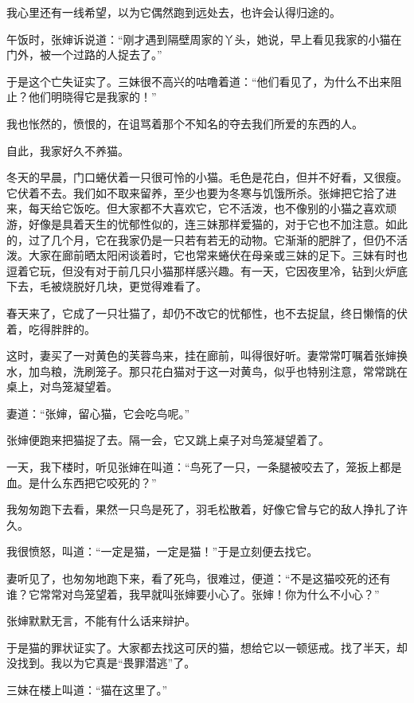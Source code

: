 \documentclass[12pt,UTF-8,openany]{ctexbook}
\begin{document}
\begin{normalsize}
    我心里还有一线希望，以为它偶然跑到远处去，也许会认得归途的。
    
    午饭时，张婶诉说道：“刚才遇到隔壁周家的丫头，她说，早上看见我家的小猫在门外，被一个过路的人捉去了。”
    
    于是这个亡失证实了。三妹很不高兴的咕噜着道：“他们看见了，为什么不出来阻止？他们明晓得它是我家的！”
    
    我也怅然的，愤恨的，在诅骂着那个不知名的夺去我们所爱的东西的人。
    
    自此，我家好久不养猫。
    
    冬天的早晨，门口蜷伏着一只很可怜的小猫。毛色是花白，但并不好看，又很瘦。它伏着不去。我们如不取来留养，至少也要为冬寒与饥饿所杀。张婶把它拾了进来，每天给它饭吃。但大家都不大喜欢它，它不活泼，也不像别的小猫之喜欢顽游，好像是具着天生的忧郁性似的，连三妹那样爱猫的，对于它也不加注意。如此的，过了几个月，它在我家仍是一只若有若无的动物。它渐渐的肥胖了，但仍不活泼。大家在廊前晒太阳闲谈着时，它也常来蜷伏在母亲或三妹的足下。三妹有时也逗着它玩，但没有对于前几只小猫那样感兴趣。有一天，它因夜里冷，钻到火炉底下去，毛被烧脱好几块，更觉得难看了。
    
    春天来了，它成了一只壮猫了，却仍不改它的忧郁性，也不去捉鼠，终日懒惰的伏着，吃得胖胖的。
    
    这时，妻买了一对黄色的芙蓉鸟来，挂在廊前，叫得很好听。妻常常叮嘱着张婶换水，加鸟粮，洗刷笼子。那只花白猫对于这一对黄鸟，似乎也特别注意，常常跳在桌上，对鸟笼凝望着。
    
    妻道：“张婶，留心猫，它会吃鸟呢。”
    
    张婶便跑来把猫捉了去。隔一会，它又跳上桌子对鸟笼凝望着了。
    
    一天，我下楼时，听见张婶在叫道：“鸟死了一只，一条腿被咬去了，笼扳上都是血。是什么东西把它咬死的？”
    
    我匆匆跑下去看，果然一只鸟是死了，羽毛松散着，好像它曾与它的敌人挣扎了许久。
    
    我很愤怒，叫道：“一定是猫，一定是猫！”于是立刻便去找它。
    
    妻听见了，也匆匆地跑下来，看了死鸟，很难过，便道：“不是这猫咬死的还有谁？它常常对鸟笼望着，我早就叫张婶要小心了。张婶！你为什么不小心？”
    
    张婶默默无言，不能有什么话来辩护。
    
    于是猫的罪状证实了。大家都去找这可厌的猫，想给它以一顿惩戒。找了半天，却没找到。我以为它真是“畏罪潜逃”了。
    
    三妹在楼上叫道：“猫在这里了。”
    

\end{normalsize}
\end{document}
